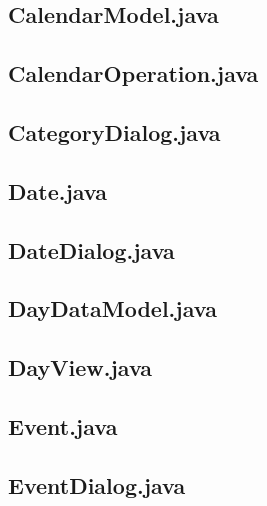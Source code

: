 \documentclass{article}
\begin{document}


\subsection{CalendarModel.java}



\subsection{CalendarOperation.java}



\subsection{CategoryDialog.java}



\subsection{Date.java}



\subsection{DateDialog.java}



\subsection{DayDataModel.java}



\subsection{DayView.java}



\subsection{Event.java}



\subsection{EventDialog.java}
\end{document}
